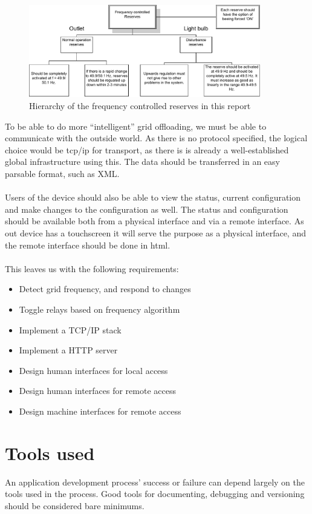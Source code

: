 \begin{figure}[!h]
  \centering
  \includegraphics[width=0.9\textwidth]{figs/Demands_for_automatic_active_reserves.pdf}
  \caption{Hierarchy of the frequency controlled reserves in this report}
  \label{fig:reserver_demands}
\end{figure}
To be able to do more ``intelligent'' grid offloading, we must be able to communicate with the outside world. As there is no protocol specified, the logical choice would be tcp/ip for transport, as there is is already a well-established global infrastructure using this. The data should be transferred in an easy parsable format, such as XML.\\\\
Users of the device should also be able to view the status, current configuration and make changes to the configuration as well. The status and configuration should be available both from a physical interface and via a remote interface. As out device has a touchscreen it will serve the purpose as a physical interface, and the remote interface should be done in html.\\\\
This leaves us with the following requirements:
\begin{itemize}
\item Detect grid frequency, and respond to changes
\item Toggle relays based on frequency algorithm
\item Implement a TCP/IP stack
\item Implement a HTTP server
\item Design human interfaces for local access
\item Design human interfaces for remote access
\item Design machine interfaces for remote access
\end{itemize}

\section{Tools used}
An application development process' success or failure can depend largely on the tools used in the process. Good tools for documenting, debugging and versioning should be considered bare minimums.
